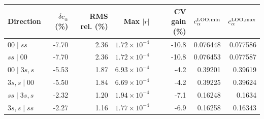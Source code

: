 \begin{tabular}{lrrrrrr}\toprule
Direction & $\delta c_\alpha$ (\%) & RMS rel. (\%) & Max $|r|$ & CV gain (\%) & $c_\alpha^{\rm LOO,min}$ & $c_\alpha^{\rm LOO,max}$\\\midrule
$00\mid ss$ & -7.70 & 2.36 & $1.72\!\times\!10^{-4}$ & -10.8 & 0.076448 & 0.077586 \\
$ss\mid 00$ & -7.70 & 2.36 & $1.72\!\times\!10^{-4}$ & -10.8 & 0.076453 & 0.077587 \\
$00\mid 3s,s$ & -5.53 & 1.87 & $6.93\!\times\!10^{-4}$ & -4.2 & 0.39201 & 0.39619 \\
$3s,s\mid 00$ & -5.50 & 1.84 & $6.69\!\times\!10^{-4}$ & -4.2 & 0.39225 & 0.39624 \\
$ss\mid 3s,s$ & -2.32 & 1.20 & $1.94\!\times\!10^{-4}$ & -7.1 & 0.16248 & 0.1634 \\
$3s,s\mid ss$ & -2.27 & 1.16 & $1.77\!\times\!10^{-4}$ & -6.9 & 0.16258 & 0.16343 \\
\bottomrule\end{tabular}
